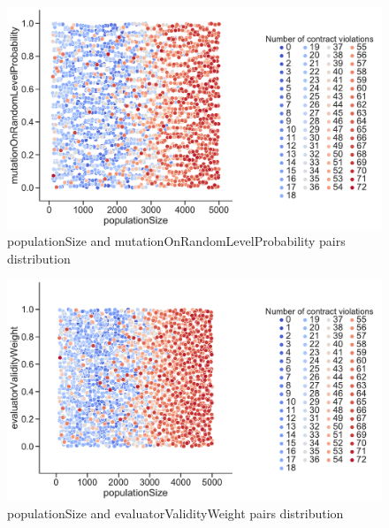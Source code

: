 \begin{figure}
	\centering
	\includegraphics[width=\textwidth]{images/PairsDistr/populationSize_mutationOnRandomLevelProbability.pdf}
	\caption[populationSize and mutationOnRandomLevelProbability pairs distribution]{populationSize and mutationOnRandomLevelProbability pairs distribution}
	\label{fig:populationSize_mutationOnRandomLevelProbability_pair}
\end{figure}
\clearpage
\begin{figure}
	\centering
	\includegraphics[width=\textwidth]{images/PairsDistr/populationSize_evaluatorValidityWeight.pdf}
	\caption[populationSize and evaluatorValidityWeight pairs distribution]{populationSize and evaluatorValidityWeight pairs distribution}
	\label{fig:populationSize_evaluatorValidityWeight_pair}
\end{figure}
\clearpage
